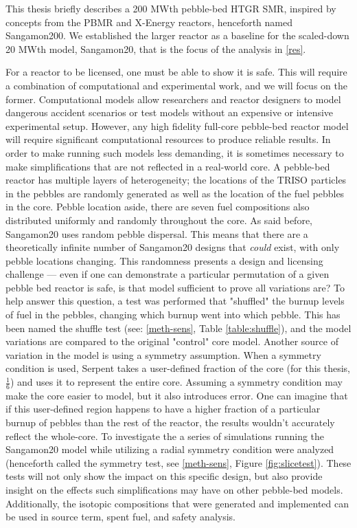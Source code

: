 This thesis briefly describes a 200 MWth pebble-bed HTGR SMR, inspired by concepts from the PBMR \cite{venter_pbmr_2005, noauthor_pebble_2017} and X-Energy \cite{harlan_x-energy_2018} reactors, henceforth named Sangamon200.  We established the larger reactor as a baseline for the scaled-down 20 MWth model, Sangamon20, that is the focus of the analysis in \autoref{res}.

For a reactor to be licensed, one must be able to show it is safe.  This will require a combination of computational and experimental work, and we will focus on the former.  Computational models allow researchers and reactor designers to model dangerous accident scenarios or test models without an expensive or intensive experimental setup. However, any high fidelity full-core pebble-bed reactor model will require significant computational resources to produce reliable results.  In order to make running such models less demanding, it is sometimes necessary to make simplifications that are not reflected in a real-world core.  A pebble-bed reactor has multiple layers of heterogeneity; the locations of the TRISO particles in the pebbles are randomly generated as well as the location of the fuel pebbles in the core.  Pebble location aside, there are seven fuel compositions also distributed uniformly and randomly throughout the core.  As said before, Sangamon20 uses random pebble dispersal.  This means that there are a theoretically infinite number of Sangamon20 designs that \emph{could} exist, with only pebble locations changing.  This randomness presents a design and licensing challenge --- even if one can demonstrate a particular permutation of a given pebble bed reactor is safe, is that model sufficient to prove all variations are?  To help answer this question, a test was performed that "shuffled" the burnup levels of fuel in the pebbles, changing which burnup went into which pebble.  This has been named the shuffle test (see: \autoref{meth-sens}, Table \ref{table:shuffle}), and the model variations are compared to the original "control" core model.  Another source of variation in the model is using a symmetry assumption.  When a symmetry condition is used, Serpent takes a user-defined fraction of the core (for this thesis, $\frac{1}{6}$) and uses it to represent the entire core.  Assuming a symmetry condition may make the core easier to model, but it also introduces error.  One can imagine that if this user-defined region happens to have a higher fraction of a particular burnup of pebbles than the rest of the reactor, the results wouldn't accurately reflect the whole-core.  To investigate the a series of simulations running the Sangamon20 model while utilizing a radial symmetry condition were analyzed (henceforth called the symmetry test, see \autoref{meth-sens}, Figure \ref{fig:slicetest}).  These tests will not only show the impact on this specific design, but also provide insight on the effects such simplifications may have on other pebble-bed models.  Additionally, the isotopic compositions that were generated and implemented can be used in source term, spent fuel, and safety analysis.

